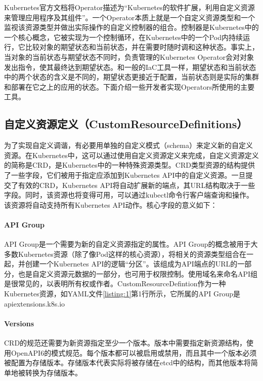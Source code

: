 \documentclass[macfonts,master]{njuthesis}
\begin{document}
Kubernetes官方文档将Operator描述为``Kubernetes的软件扩展，利用自定义资源来管理应用程序及其组件''\cite{k8soperator}。一个Operator本质上就是一个自定义资源类型和一个监视该资源类型并做出实际操作的自定义控制器的组合。控制器是Kubernetes中的一个核心概念，它被实现为一个控制循环，在Kubernetes中的一个Pod内持续运行，它比较对象的期望状态和当前状态，并在需要时随时调和这种状态。事实上，当对象的当前状态与期望状态不同时，负责管理的Kubernetes Operator会对对象发出指令，使其最终达到期望状态。和一般的IaC工具一样，期望状态和当前状态中的两个状态的含义是不同的，期望状态更接近于配置，当前状态则是实际的集群和部署在它之上的应用的状态。下面介绍一些开发者实现Operators所使用的主要工具。

\subsection{自定义资源定义（CustomResourceDefinitions）}\label{section:CRD}

为了实现自定义调谐，有必要用单独的自定义模式（schema）来定义新的自定义资源。在Kubernetes中，这可以通过使用自定义资源定义来完成，自定义资源定义的简称是CRD，是Kubernetes中的一种特殊资源类型。CRD类型资源的结构提供了一些字段，它们被用于指定应添加到Kubernetes API中的自定义资源。一旦提交了有效的CRD，Kubernetes API将自动扩展新的端点，其URL结构取决于一些字段。同时，该资源也将变得可用，可以通过kubectl命令行客户端查询和操作。该资源将自动支持所有Kubernetes API动作。核心字段的意义如下：

\paragraph{API Group}

API Group是一个需要为新的自定义资源指定的属性。API Group的概念被用于大多数Kubernetes资源（除了像Pod这样的核心资源），将相关的资源类型组合在一起，并创建一个Kubernetes API的逻辑``分区''。该组成为API端点的URL的一部分，也是自定义资源元数据的一部分，也可用于权限控制。使用域名来命名API组是很常见的，以表明所有权或作者。CustomResourceDefintion作为一种Kubernetes资源，如YAML文件\ref{listing:1}第1行所示，它所属的API Group是apiextensions.k8s.io

\paragraph{Versions}

CRD的规范还需要为新资源指定至少一个版本。版本中需要指定新资源结构，使用OpenAPI6的模式规范。每个版本都可以被启用或禁用，而且其中一个版本必须被配置为存储版本。存储版本代表实际将被存储在etcd中的结构，而其他版本将简单地被转换为存储版本。
\end{document}
